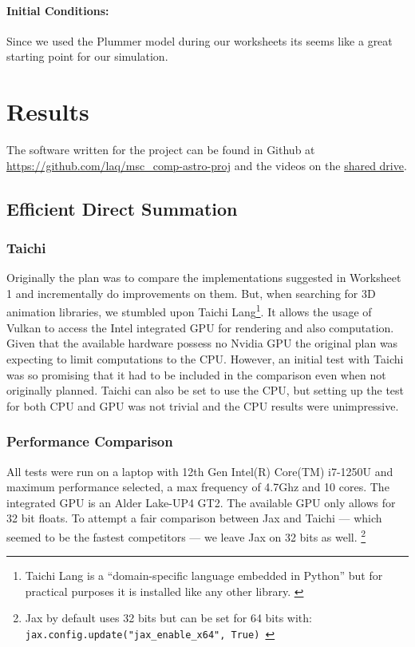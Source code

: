 \documentclass[a4paper, 11pt]{article}         %
\begin{document}
\paragraph{Initial Conditions:}
Since we used the Plummer model during our worksheets its seems like a great starting point for our simulation. \parencite{ws5,ws7}



\section{Results}
The software written for the project can be found in Github at \url{https://github.com/laq/msc_comp-astro-proj} and the videos on the \href{https://drive.google.com/drive/folders/17HjF1KmQAJzP7fJ5GMh5vFHURGo9tkBM?usp=sharing}{shared drive}.


\subsection{Efficient Direct Summation}
\subsubsection{Taichi}
Originally the plan was to compare the implementations suggested in Worksheet 1\parencite{ws1} and incrementally do improvements on them. But, when searching for 3D animation libraries, we stumbled upon
Taichi Lang\footnote{Taichi Lang is a ``domain-specific language embedded in Python'' but for practical purposes it is installed like any other library. \parencite{TaichiLang}}. It allows the usage of Vulkan\parencite{Vulkan} to access the Intel integrated GPU for rendering and also computation.
Given that the available hardware possess no Nvidia GPU the original plan was expecting to limit computations to the CPU. However, an initial test with Taichi was so promising that it had to be included in the comparison even when not originally planned. Taichi can also be set to use the CPU, but setting up the test for both CPU and GPU was not trivial and the CPU results were unimpressive.

\subsubsection{Performance Comparison}

All tests were run on a laptop with 12th Gen Intel(R) Core(TM) i7-1250U and maximum performance selected, a max frequency of 4.7Ghz and 10 cores. The integrated GPU is an Alder Lake-UP4 GT2.
The available GPU only allows for 32 bit floats. To attempt a fair comparison between Jax and Taichi --- which seemed to be the fastest competitors --- we leave Jax on 32 bits as well. \footnote{Jax by default uses 32 bits but can be set for 64 bits with: \texttt{jax.config.update("jax\_enable\_x64", True) }}
\end{document}
